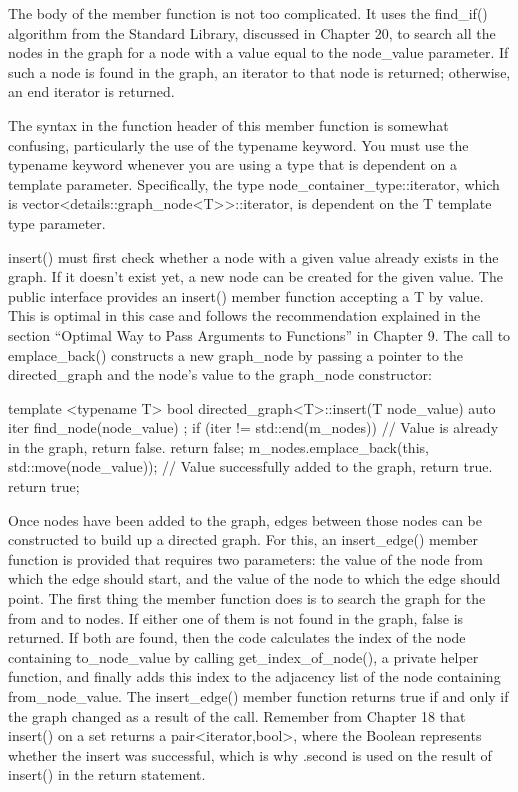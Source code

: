 The body of the member function is not too complicated. It uses the find\_if() algorithm from the Standard Library, discussed in Chapter 20, to search all the nodes in the graph for a node with a value equal to the node\_value parameter. If such a node is found in the graph, an iterator to that node is returned; otherwise, an end iterator is returned.

The syntax in the function header of this member function is somewhat confusing, particularly the use of the typename keyword. You must use the typename keyword whenever you are using a type that is dependent on a template parameter. Specifically, the type node\_container\_type::iterator, which is vector<details::graph\_node<T>{}>::iterator, is dependent on the T template type parameter.


insert() must first check whether a node with a given value already exists in the graph. If it doesn’t exist yet, a new node can be created for the given value. The public interface provides an insert() member function accepting a T by value. This is optimal in this case and follows the recommendation explained in the section “Optimal Way to Pass Arguments to Functions” in Chapter 9. The call to emplace\_back() constructs a new graph\_node by passing a pointer to the directed\_graph and the node’s value to the graph\_node constructor:

\begin{cpp}
template <typename T>
bool directed_graph<T>::insert(T node_value)
{
    auto iter { find_node(node_value) };
    if (iter != std::end(m_nodes)) {
        // Value is already in the graph, return false.
        return false;
    }
    m_nodes.emplace_back(this, std::move(node_value));
    // Value successfully added to the graph, return true.
    return true;
}
\end{cpp}


Once nodes have been added to the graph, edges between those nodes can be constructed to build up a directed graph. For this, an insert\_edge() member function is provided that requires two parameters: the value of the node from which the edge should start, and the value of the node to which the edge should point. The first thing the member function does is to search the graph for the from and to nodes. If either one of them is not found in the graph, false is returned. If both are found, then the code calculates the index of the node containing to\_node\_value by calling get\_index\_of\_node(), a private helper function, and finally adds this index to the adjacency list of the node containing from\_node\_value. The insert\_edge() member function returns true if and only if the graph changed as a result of the call. Remember from Chapter 18 that insert() on a set returns a pair<iterator,bool>, where the Boolean represents whether the insert was successful, which is why .second is used on the result of insert() in the return statement.

